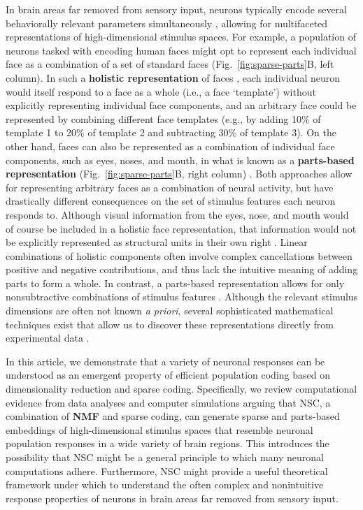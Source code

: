 In brain areas far removed from sensory input,
neurons typically encode several behaviorally relevant parameters
simultaneously \cite{Rigotti2013,Park2014,PaganRust2014,PougetSejnowski1997},
allowing for multifaceted representations of high-dimensional stimulus spaces.
For example, a population of neurons tasked with encoding human faces
might opt to represent each individual face as a combination of a set of
standard faces (Fig.~\ref{fig:sparse-parts}B, left column).
In such a \textbf{holistic representation} of faces \cite{TanakaFarah1993},
each individual neuron would itself respond to a face as a whole
(i.e., a face `template')
without explicitly representing individual face components,
and an arbitrary face could be represented by 
combining different face templates
(e.g., by adding 10\% of template 1 to 20\% of template 2
and subtracting 30\% of template 3).
On the other hand, faces can also be represented as a combination
of individual face components, such as eyes, noses, and mouth,
in what is known as a \textbf{parts-based representation}
(Fig.~\ref{fig:sparse-parts}B, right column) \cite{Palmer1977}.
Both approaches allow for representing arbitrary faces as a combination of
neural activity, but have drastically different consequences on the
set of stimulus features each neuron responds to.
Although visual information from the eyes, nose, and mouth would of course be
included in a holistic face representation,
that information would not be explicitly represented as structural units
in their own right \cite{TanakaFarah1993}.
Linear combinations of holistic components often involve complex cancellations
between positive and negative contributions,
and thus lack the intuitive meaning of adding parts to form a whole.
In contrast, a parts-based representation allows for only nonsubtractive
combinations of stimulus features \cite{Palmer1977}.
Although the relevant stimulus dimensions are often not known \emph{a priori},
several sophisticated mathematical techniques exist that
allow us to discover these representations directly from experimental data
\cite{Brunton2016,CunninghamYu2014,PillowSimoncelli2006,Sharpee2014,Gao2017}.

In this article, we demonstrate that a variety of neuronal responses
can be understood as an emergent property of efficient population coding
based on dimensionality reduction and sparse coding.
Specifically, we review computational evidence
from data analyses and computer simulations arguing that \ac{NSC}, 
a combination of \textbf{\ac{NMF}}
\cite{PaateroTapper1994,LeeSeung1999} 
and sparse coding,
can generate sparse and parts-based embeddings of
high-dimensional stimulus spaces
that resemble neuronal population responses in a 
wide variety of brain regions.
This introduces the possibility that \ac{NSC} might
be a general principle to which many neuronal computations adhere.
Furthermore, \ac{NSC} might provide a useful theoretical framework under which
to understand the often complex and nonintuitive response properties of neurons
in brain areas far removed from sensory input.
